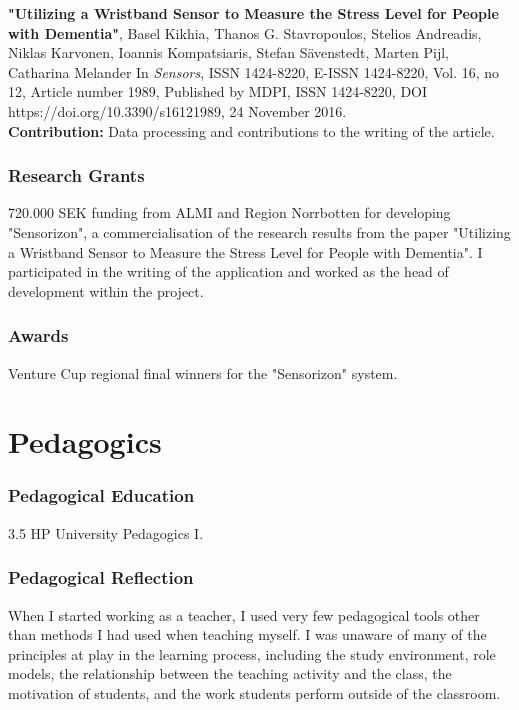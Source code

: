 \documentclass{article}
\begin{document}
\textbf{ "Utilizing a Wristband Sensor to Measure the Stress Level for People with Dementia"},
Basel Kikhia, Thanos G. Stavropoulos, Stelios Andreadis, Niklas Karvonen, Ioannis Kompatsiaris, Stefan Sävenstedt, Marten Pijl, Catharina Melander
In \textit{Sensors}, ISSN 1424-8220, E-ISSN 1424-8220, Vol. 16, no 12, Article number 1989,
Published by MDPI, ISSN 1424-8220,
DOI https://doi.org/10.3390/s16121989,
24 November 2016.\\
\textbf{Contribution:} Data processing and contributions to the writing of the article.

\subsubsection{Research Grants}
720.000 SEK funding from ALMI and Region Norrbotten for developing "Sensorizon", a commercialisation of the research results from the paper "Utilizing a Wristband Sensor to Measure the Stress Level for People with Dementia". I participated in the writing of the application and worked as the head of development within the project.

\subsubsection{Awards}
Venture Cup regional final winners for the "Sensorizon" system.


\section{Pedagogics}
\subsubsection{Pedagogical Education}
3.5 HP University Pedagogics I.

\subsubsection{Pedagogical Reflection}
When I started working as a teacher, I used very few pedagogical tools other than methods I had used when teaching myself. I was unaware of many of the principles at play in the learning process, including the study environment, role models, the relationship between the teaching activity and the class, the motivation of students, and the work students perform outside of the classroom.
\end{document}
